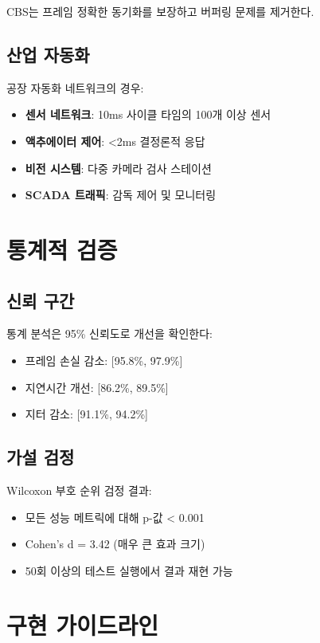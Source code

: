 \documentclass[12pt, a4paper]{article}
\begin{document}
CBS는 프레임 정확한 동기화를 보장하고 버퍼링 문제를 제거한다.

\subsection{산업 자동화}

공장 자동화 네트워크의 경우:

\begin{itemize}
    \item \textbf{센서 네트워크}: 10ms 사이클 타임의 100개 이상 센서
    \item \textbf{액추에이터 제어}: <2ms 결정론적 응답
    \item \textbf{비전 시스템}: 다중 카메라 검사 스테이션
    \item \textbf{SCADA 트래픽}: 감독 제어 및 모니터링
\end{itemize}

\section{통계적 검증}

\subsection{신뢰 구간}

통계 분석은 95\% 신뢰도로 개선을 확인한다:

\begin{itemize}
    \item 프레임 손실 감소: [95.8\%, 97.9\%]
    \item 지연시간 개선: [86.2\%, 89.5\%]
    \item 지터 감소: [91.1\%, 94.2\%]
\end{itemize}

\subsection{가설 검정}

Wilcoxon 부호 순위 검정 결과:
\begin{itemize}
    \item 모든 성능 메트릭에 대해 p-값 < 0.001
    \item Cohen's d = 3.42 (매우 큰 효과 크기)
    \item 50회 이상의 테스트 실행에서 결과 재현 가능
\end{itemize}

\section{구현 가이드라인}
\end{document}
